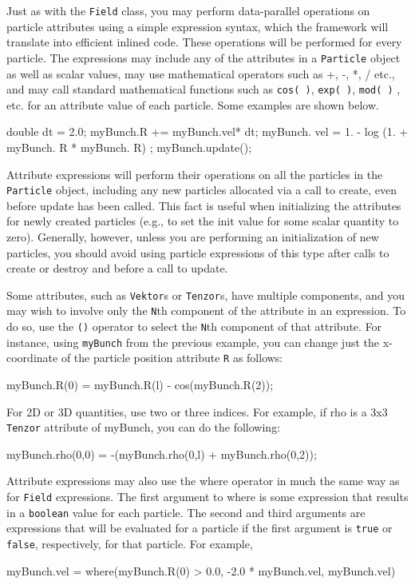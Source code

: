 Just as with the \texttt{Field} class, you may perform data-parallel operations on particle attributes using a simple expression syntax, which the \ippl framework will translate into efficient inlined code. These operations will be performed for every particle. The expressions may include any of the attributes in a \texttt{Particle} object as well as scalar values, may use mathematical operators such as +, -, *, / etc., and may call standard mathematical functions such as \texttt{cos(
)}, \texttt{exp( )}, \texttt{mod( )} , etc. for an attribute value of each particle. Some examples are shown below.
\begin{smallcode}
double dt = 2.0;
myBunch.R += myBunch.vel* dt;
myBunch. vel = 1. - log (1. + myBunch. R * myBunch. R) ;
myBunch.update();
\end{smallcode}


Attribute expressions will perform their operations on all the particles in the \texttt{Particle} object, including any new particles allocated via a call to create, even before update has been called. This fact is useful when initializing the attributes for newly created particles (e.g., to set the init value for some scalar quantity to zero). Generally, however, unless you are performing an initialization of new particles, you should avoid using particle expressions of this type after calls to create or destroy and before a call to update.

Some attributes, such as \texttt{Vektor}s or \texttt{Tenzor}s, have multiple components, and you may wish to involve only the \texttt{N}th component of the attribute in an expression. To do so, use the \texttt{()} operator to select the \texttt{N}th component of that attribute. For instance, using \texttt{myBunch} from the previous example, you can change just the x-coordinate of the particle position attribute \texttt{R} as follows:
\begin{smallcode}
myBunch.R(0) = myBunch.R(l) - cos(myBunch.R(2));
\end{smallcode}


For 2D or 3D quantities, use two or three indices. For example, if rho is a 3x3 \texttt{Tenzor} attribute of myBunch, you can do the following:
\begin{smallcode}
myBunch.rho(0,0) = -(myBunch.rho(0,l) + myBunch.rho(0,2));
\end{smallcode}

Attribute expressions may also use the where operator in much the same way as for \texttt{Field} expressions. The first argument to where is some expression that results in a \texttt{boolean} value for each particle. The second and third arguments are expressions that will be evaluated for a particle if the first argument is \texttt{true} or \texttt{false}, respectively, for that particle. For example,
\begin{smallcode}
myBunch.vel = where(myBunch.R(0) > 0.0, -2.0 * myBunch.vel, myBunch.vel)
\end{smallcode}

